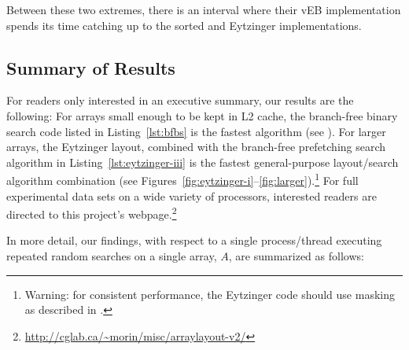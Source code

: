 \documentclass{patmorin}
\newcommand{\lstref}[1]{Listing~\ref{lst:#1}}
\begin{document}
Between these two extremes, there is an interval where their vEB
implementation spends its time catching up to the sorted and Eytzinger
implementations.


\subsection{Summary of Results}

For readers only interested in an executive summary, our results
are the following: For arrays small enough to be kept in L2 cache,
the branch-free binary search code listed in \lstref{bfbs} is
the fastest algorithm (see ).  For larger
arrays, the Eytzinger layout, combined with the branch-free
prefetching search algorithm in \lstref{eytzinger-iii} is the
fastest general-purpose layout/search algorithm combination (see
Figures~\ref{fig:eytzinger-i}--\ref{fig:larger}).\footnote{Warning:
for consistent performance, the Eytzinger code should
use masking as described in .}
For full experimental data sets on a wide variety of
processors, interested readers are directed to this project's
webpage.\footnote{\url{http://cglab.ca/~morin/misc/arraylayout-v2/}}

In more detail, our findings, with respect to a single process/thread
executing repeated random searches on a single array, $A$, are summarized
as follows:
\end{document}

